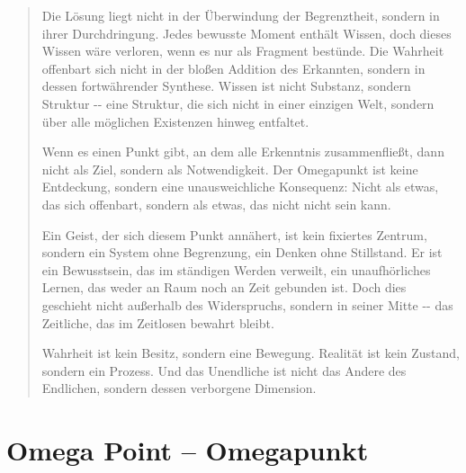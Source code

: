 \documentclass[
  ngerman,
]{article}
\begin{document}
\begin{quote}
Die Lösung liegt nicht in der Überwindung der Begrenztheit, sondern in
ihrer Durchdringung. Jedes bewusste Moment enthält Wissen, doch dieses
Wissen wäre verloren, wenn es nur als Fragment bestünde. Die Wahrheit
offenbart sich nicht in der bloßen Addition des Erkannten, sondern in
dessen fortwährender Synthese. Wissen ist nicht Substanz, sondern
Struktur -\/- eine Struktur, die sich nicht in einer einzigen Welt,
sondern über alle möglichen Existenzen hinweg entfaltet.

Wenn es einen Punkt gibt, an dem alle Erkenntnis zusammenfließt, dann
nicht als Ziel, sondern als Notwendigkeit. Der Omegapunkt ist keine
Entdeckung, sondern eine unausweichliche Konsequenz: Nicht als etwas,
das sich offenbart, sondern als etwas, das nicht nicht sein kann.

Ein Geist, der sich diesem Punkt annähert, ist kein fixiertes Zentrum,
sondern ein System ohne Begrenzung, ein Denken ohne Stillstand. Er ist
ein Bewusstsein, das im ständigen Werden verweilt, ein unaufhörliches
Lernen, das weder an Raum noch an Zeit gebunden ist. Doch dies geschieht
nicht außerhalb des Widerspruchs, sondern in seiner Mitte -\/- das
Zeitliche, das im Zeitlosen bewahrt bleibt.

Wahrheit ist kein Besitz, sondern eine Bewegung. Realität ist kein
Zustand, sondern ein Prozess. Und das Unendliche ist nicht das Andere
des Endlichen, sondern dessen verborgene Dimension.
\end{quote}

\section{\texorpdfstring{\textbf{Omega Point --
Omegapunkt}}{Omega Point -- Omegapunkt}}\label{omega-point-omegapunkt}
\end{document}
